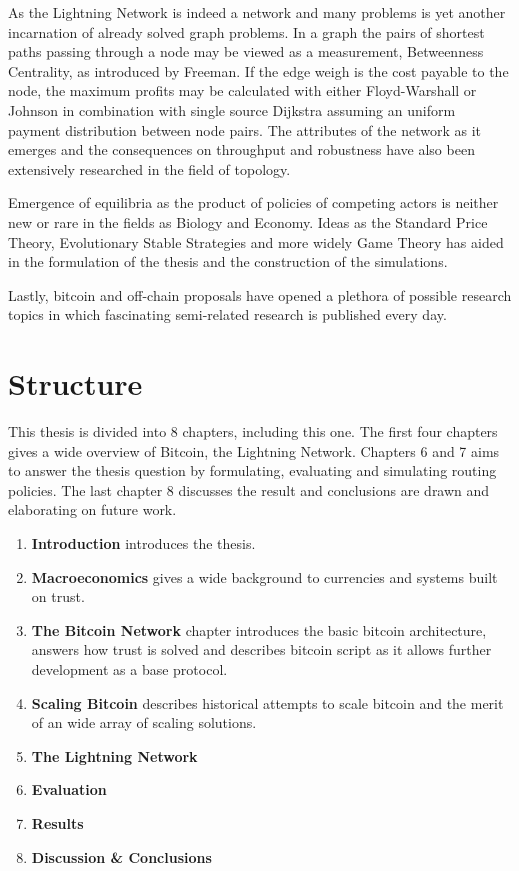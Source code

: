 	As the Lightning Network is indeed a network and many problems is yet another incarnation of already solved graph problems. In a graph the pairs of shortest paths passing through a node may be viewed as a measurement, Betweenness Centrality, as introduced by Freeman. If the edge weigh is the cost payable to the node, the maximum profits may be calculated with either Floyd-Warshall or Johnson in combination with single source Dijkstra assuming an uniform payment distribution between node pairs. The attributes of the network as it emerges and the consequences on throughput and robustness have also been extensively researched in the field of topology.
	
	Emergence of equilibria as the product of policies of competing actors is neither new or rare in the fields as Biology and Economy. Ideas as the Standard Price Theory, Evolutionary Stable Strategies and more widely Game Theory has aided in the formulation of the thesis and the construction of the simulations.
	
	Lastly, bitcoin and off-chain proposals have opened a plethora of possible research topics in which fascinating semi-related research is published every day.  
	
	
\section{Structure}

This thesis is divided into 8 chapters, including this one. The first four chapters gives a wide overview of Bitcoin, the Lightning Network. Chapters 6 and 7 aims to answer the thesis question by formulating, evaluating and simulating routing policies. The last chapter 8 discusses the result and conclusions are drawn and elaborating on future work.

\begin{enumerate}
	\item \textbf{Introduction} introduces the thesis.
	\item \textbf{Macroeconomics} gives a wide background to currencies and systems built on trust. 
	\item \textbf{The Bitcoin Network} chapter introduces the basic bitcoin architecture, answers how trust is solved and describes bitcoin script as it allows further development as a base protocol.
	\item \textbf{Scaling Bitcoin} describes historical attempts to scale bitcoin and the merit of an wide array of scaling solutions.
	\item \textbf{The Lightning Network} 
	\item \textbf{Evaluation}
	\item \textbf{Results}
	\item \textbf{Discussion \& Conclusions}
\end{enumerate}